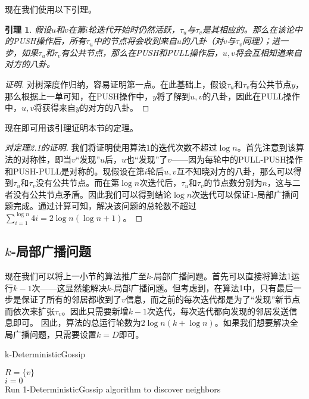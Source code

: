 \documentclass[12pt]{article}
\newtheorem{lemma}[theorem]{引理}
\begin{document}
现在我们使用以下引理。
\begin{lemma}
  假设$u$和$v$在第$i$轮迭代开始时仍然活跃，$\tau_u$与$\tau_v$是其相应的\itree。那么在该论中的PUSH操作后，所有$\tau_u$中的节点将会收到来自$u$的八卦（对$v$与$\tau_v$同理）；进一步，如果$\tau_u$和$\tau_v$有公共节点，那么在PUSH和PULL操作后，$u,v$将会互相知道来自对方的八卦。
\end{lemma}
\begin{proof}[证明]
  对树深度作归纳，容易证明第一点。在此基础上，假设$\tau_u$和$\tau_v$有公共节点$y$，那么根据上一单可知，在PUSH操作中，$y$将了解到$u,v$的八卦，因此在PULL操作中，$u,v$将获得来自$y$的对方的八卦。
\end{proof}
现在即可用该引理证明本节的定理。
\begin{proof}[对\rm{定理2.1}的证明]
  我们将证明使用\rm{算法1}的迭代次数不超过$\log n$。首先注意到该算法的对称性，即当$v$“发现”$u$后，$u$也“发现”了$v$——因为每轮中的PULL-PUSH操作和PUSH-PULL是对称的。现假设在第$i$轮后$u,v$互不知晓对方的八卦，那么可以得到$\tau_u$和$\tau_v$没有公共节点。而在第$\log n$次迭代后，$\tau_u$和$\tau_v$的节点数分别为$n$，这与二者没有公共节点矛盾。因此我们可以得到结论$\log n$次迭代可以保证$1$-局部广播问题完成。通过计算可知，解决该问题的总轮数不超过$\sum_{i=1}^{\log n}4i = 2\log n(\log n + 1)$。
\end{proof}

\subsection{$k$-局部广播问题}
现在我们可以将上一小节的算法推广至$k$-局部广播问题。首先可以直接将算法1运行$k-1$次——这显然能解决$k$-局部广播问题。但考虑到，在算法1中，只有最后一步是保证了所有的邻居都收到了$v$信息，而之前的每次迭代都是为了“发现”新节点而依次来扩张$\tau_v$。因此只需要新增$k-1$次迭代，每次迭代都向发现的邻居发送信息即可。
因此，算法的总运行轮数为$2\log n(k + \log n)$。如果我们想要解决全局广播问题，只需要设置$k=D$即可。


\begin{algorithm}[H]
  \caption{k-DeterministicGossip}
  \SetAlgoNoLine
  $R=\{v\}$\\
  $i=0$\\
  Run 1-DeterministicGossip algorithm to discover neighbors
\end{algorithm}
\end{document}
